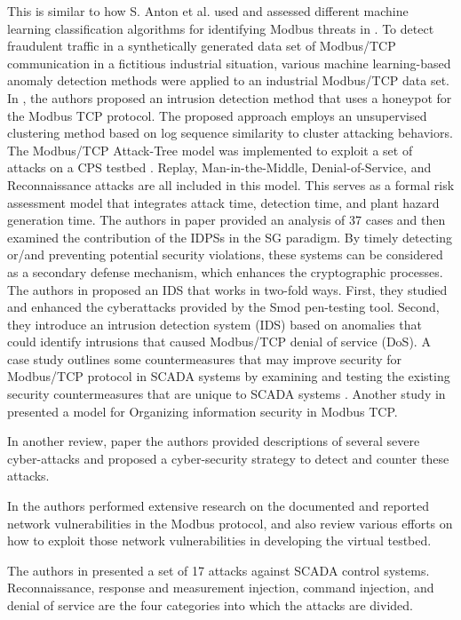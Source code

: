 \documentclass[letterpaper,10pt,conference]{IEEEtran}
\begin{document}
This is similar to how S. Anton et al. used and assessed different machine learning classification algorithms for identifying Modbus threats in \cite{R9}. To detect fraudulent traffic in a synthetically generated data set of Modbus/TCP communication in a fictitious industrial situation, various machine learning-based anomaly detection methods were applied to an industrial Modbus/TCP data set. In \cite{R10}, the authors proposed an intrusion detection method that uses a honeypot for the Modbus TCP protocol. The proposed approach employs an unsupervised clustering method based on log sequence similarity to cluster attacking behaviors.
The Modbus/TCP Attack-Tree model was implemented to exploit a set of attacks on a CPS testbed \cite{R11}. Replay, Man-in-the-Middle, Denial-of-Service, and Reconnaissance attacks are all included in this model. This serves as a formal risk assessment model that integrates attack time, detection time, and plant hazard generation time.
The authors in paper \cite{R12} provided an analysis of 37 cases and then examined the contribution of the IDPSs in the SG paradigm. By timely detecting or/and preventing potential security violations, these systems can be considered as a secondary defense mechanism, which enhances the cryptographic processes.
The authors in \cite{R13} proposed an IDS that works in two-fold ways. First, they studied and enhanced the cyberattacks provided by the Smod pen-testing tool. Second, they introduce an intrusion detection system (IDS) based on anomalies that could identify intrusions that caused Modbus/TCP denial of service (DoS). 
A case study outlines some countermeasures that may improve security for Modbus/TCP protocol in SCADA systems by examining and testing the existing security countermeasures that are unique to SCADA systems \cite{R14}.
Another study in \cite{R15} presented a model for Organizing information security in Modbus TCP. 

In another review, paper \cite{R16} the authors provided descriptions of several severe cyber-attacks and proposed a cyber-security strategy to detect and counter these attacks. 

In \cite{R18} the authors performed extensive research on the documented and reported network vulnerabilities in the Modbus protocol, and also review various efforts on how to exploit those network vulnerabilities in developing the virtual testbed.

The authors in \cite{R19} presented a set of 17 attacks against SCADA control systems. Reconnaissance, response and measurement injection, command injection, and denial of service are the four categories into which the attacks are divided.
\end{document}
